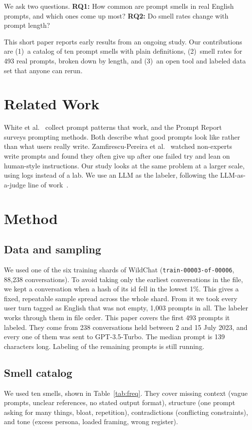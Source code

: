 \documentclass[conference]{IEEEtran}
\begin{document}
We ask two questions.
\textbf{RQ1:} How common are prompt smells in real English prompts, and which ones
come up most?
\textbf{RQ2:} Do smell rates change with prompt length?

This short paper reports early results from an ongoing study. Our contributions
are (1)~a catalog of ten prompt smells with plain definitions, (2)~smell rates for
493 real prompts, broken down by length, and (3)~an open tool and labeled data set
that anyone can rerun.

\section{Related Work}
White et al.~\cite{white} collect prompt patterns that work, and the Prompt
Report~\cite{promptreport} surveys prompting methods. Both describe what good
prompts look like rather than what users really write. Zamfirescu-Pereira
et al.~\cite{johnny} watched non-experts write prompts and found they often
give up after one failed try and lean on human-style instructions. Our study looks
at the same problem at a larger scale, using logs instead of a lab. We use an
LLM as the labeler, following the LLM-as-a-judge line of work~\cite{judge}.

\section{Method}
\subsection{Data and sampling}
We used one of the six training shards of WildChat (\texttt{train-00003-of-00006},
88,238 conversations). To avoid taking only the earliest conversations in the
file, we kept a conversation when a hash of its id fell in the lowest 1\%. This
gives a fixed, repeatable sample spread across the whole shard. From it we took
every user turn tagged as English that was not empty, 1,003 prompts in all.
The labeler works through them in file order. This paper covers the first 493
prompts it labeled. They come from 238 conversations held between 2 and 15 July
2023, and every one of them was sent to GPT-3.5-Turbo. The median prompt is 139
characters long. Labeling of the remaining prompts is still running.

\subsection{Smell catalog}
We used ten smells, shown in Table~\ref{tab:freq}. They cover missing context
(vague prompts, unclear references, no stated output format), structure (one
prompt asking for many things, bloat, repetition), contradictions (conflicting
constraints), and tone (excess persona, loaded framing, wrong register).
\end{document}
